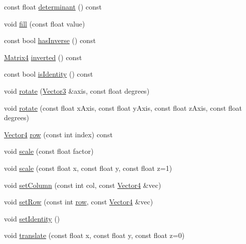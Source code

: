 \begin{DoxyCompactItemize}
const float \hyperlink{classprism_1_1geometry_1_1_matrix4_a7fcc3058850a6a412b2ee950bf972fe6}{determinant} () const 
\item 
void \hyperlink{classprism_1_1geometry_1_1_matrix4_ad3190f5200f03b0799c6a7e6ec7495ab}{fill} (const float value)
\item 
const bool \hyperlink{classprism_1_1geometry_1_1_matrix4_abe27f85ed73f720845384d1c4f58a6ad}{has\+Inverse} () const 
\item 
\hyperlink{classprism_1_1geometry_1_1_matrix4}{Matrix4} \hyperlink{classprism_1_1geometry_1_1_matrix4_a6f5b787a096b2d7bf24201a9ad973373}{inverted} () const 
\item 
const bool \hyperlink{classprism_1_1geometry_1_1_matrix4_af40d2f75c6cc7b76fc31f8b9b0a418c7}{is\+Identity} () const 
\item 
void \hyperlink{classprism_1_1geometry_1_1_matrix4_ab705bf4843e9966cf3825bce2c14c2f8}{rotate} (\hyperlink{classprism_1_1geometry_1_1_vector3}{Vector3} \&axis, const float degrees)
\item 
void \hyperlink{classprism_1_1geometry_1_1_matrix4_a0ff6e10941c4da2f602c39fea1de1d1b}{rotate} (const float x\+Axis, const float y\+Axis, const float z\+Axis, const float degrees)
\item 
\hyperlink{classprism_1_1geometry_1_1_vector4}{Vector4} \hyperlink{classprism_1_1geometry_1_1_matrix4_ad86ea7ce40789f10cafa0ec56403f0fd}{row} (const int index) const 
\item 
void \hyperlink{classprism_1_1geometry_1_1_matrix4_a948f106919d3d4f36313065e476e5881}{scale} (const float factor)
\item 
void \hyperlink{classprism_1_1geometry_1_1_matrix4_ab6ae470e439f1dac65b1dd959d57f0c5}{scale} (const float x, const float y, const float z=1)
\item 
void \hyperlink{classprism_1_1geometry_1_1_matrix4_a69ba7264fbe5b126f0bd717502b42b87}{set\+Column} (const int col, const \hyperlink{classprism_1_1geometry_1_1_vector4}{Vector4} \&vec)
\item 
void \hyperlink{classprism_1_1geometry_1_1_matrix4_a4ae5f6bd53f9165099b2fc1124c1fd8e}{set\+Row} (const int \hyperlink{classprism_1_1geometry_1_1_matrix4_ad86ea7ce40789f10cafa0ec56403f0fd}{row}, const \hyperlink{classprism_1_1geometry_1_1_vector4}{Vector4} \&vec)
\item 
void \hyperlink{classprism_1_1geometry_1_1_matrix4_ab887190e2fe938bc38f3f269afb39a40}{set\+Identity} ()
\item 
void \hyperlink{classprism_1_1geometry_1_1_matrix4_abcaa8435644688b260ff35c40e94e811}{translate} (const float x, const float y, const float z=0)

\end{DoxyCompactItemize}

